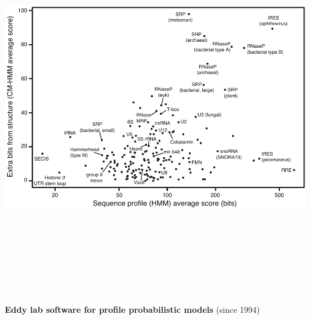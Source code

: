 \documentclass[landscape]{slides}
\begin{document}
\begin{slide}
\begin{slide}
\begin{center}
\includegraphics[height=6.5in]{figs/avgscores-rfam11}
\end{center}

\vfill

\end{slide}
\begin{slide}
\begin{center}
\textbf{Eddy lab software for profile probabilistic models } (since 1994)
\end{center}
\medskip


\end{slide}
\end{slide}
\end{document}
